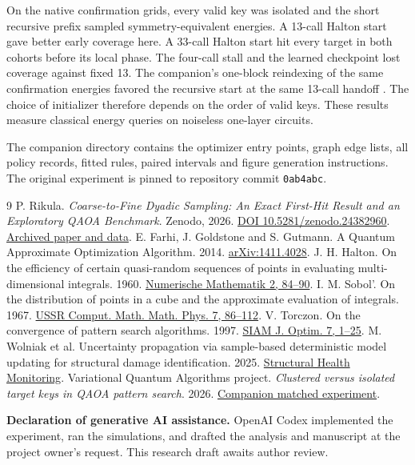 \documentclass[11pt]{article}
\newcommand{\subt}[1]{\smallskip\noindent{\sffamily\bfseries\color{teal}#1}\par}
\begin{document}
\subt{Choosing a start for the observed geometry}
On the native confirmation grids, every valid key was isolated and the short recursive prefix sampled symmetry-equivalent energies. A 13-call Halton start gave better early coverage here. A 33-call Halton start hit every target in both cohorts before its local phase. The four-call stall and the learned checkpoint lost coverage against fixed 13. The companion's one-block reindexing of the same confirmation energies favored the recursive start at the same 13-call handoff \cite{clusterstudy}. The choice of initializer therefore depends on the order of valid keys. These results measure classical energy queries on noiseless one-layer circuits.

\subt{Reproducibility}
{\footnotesize The companion directory contains the optimizer entry points, graph edge lists, all policy records, fitted rules, paired intervals and figure generation instructions. The original experiment is pinned to repository commit \texttt{0ab4abc}.\par}
\begingroup\footnotesize
\renewcommand{\refname}{\sffamily\small\color{teal}References}
\begin{thebibliography}{9}\setlength{\itemsep}{0pt}\setlength{\parskip}{0pt}
 P. Rikula. \emph{Coarse-to-Fine Dyadic Sampling: An Exact First-Hit Result and an Exploratory QAOA Benchmark}. Zenodo, 2026. \href{https://doi.org/10.5281/zenodo.24382960}{DOI 10.5281/zenodo.24382960}. \href{https://github.com/kummahiih/variational-quantum-algorithms/tree/0ab4abc6ea3a980cd86ac77447979b5e469b54d5/paper}{Archived paper and data}.
 E. Farhi, J. Goldstone and S. Gutmann. A Quantum Approximate Optimization Algorithm. 2014. \href{https://arxiv.org/abs/1411.4028}{arXiv:1411.4028}.
 J. H. Halton. On the efficiency of certain quasi-random sequences of points in evaluating multi-dimensional integrals. 1960. \href{https://doi.org/10.1007/BF01386213}{Numerische Mathematik 2, 84--90}.
 I. M. Sobol'. On the distribution of points in a cube and the approximate evaluation of integrals. 1967. \href{https://doi.org/10.1016/0041-5553(67)90144-9}{USSR Comput. Math. Math. Phys. 7, 86--112}.
 V. Torczon. On the convergence of pattern search algorithms. 1997. \href{https://doi.org/10.1137/S1052623493250780}{SIAM J. Optim. 7, 1--25}.
 M. Wolniak et al. Uncertainty propagation via sample-based deterministic model updating for structural damage identification. 2025. \href{https://doi.org/10.1177/14759217251387535}{Structural Health Monitoring}.
 Variational Quantum Algorithms project. \emph{Clustered versus isolated target keys in QAOA pattern search}. 2026. \href{https://github.com/kummahiih/variational-quantum-algorithms/blob/main/paper/clusters/cluster_assumption.pdf}{Companion matched experiment}.
\end{thebibliography}
\endgroup
{\footnotesize\textbf{Declaration of generative AI assistance.} OpenAI Codex implemented the experiment, ran the simulations, and drafted the analysis and manuscript at the project owner's request. This research draft awaits author review.\par}
\end{document}
